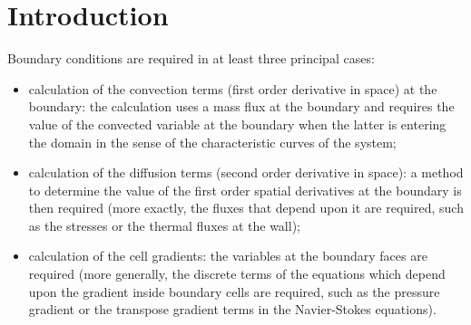 
%
%
%
%

\section{Introduction}

Boundary conditions are required in at least three principal cases:
 
\begin{itemize}
\item calculation of the convection terms (first order derivative in space) at
the boundary: the calculation uses a mass flux at the boundary and requires the 
value of the convected variable at the boundary when the latter is entering 
the domain in the sense of the characteristic curves of the system;
\item calculation of the diffusion terms (second order derivative
in space):
a method to determine the value of the first order spatial derivatives 
at the boundary is then required 
 (more exactly, the fluxes that depend upon it are required,
 such as the stresses or the thermal fluxes at the wall);
\item calculation of the cell  gradients: the variables at the boundary faces
 are required (more generally, the discrete terms of the equations which depend
upon the gradient inside boundary cells are required, such as the pressure gradient or
the transpose gradient terms in the Navier-Stokes equations). 
\end{itemize}

